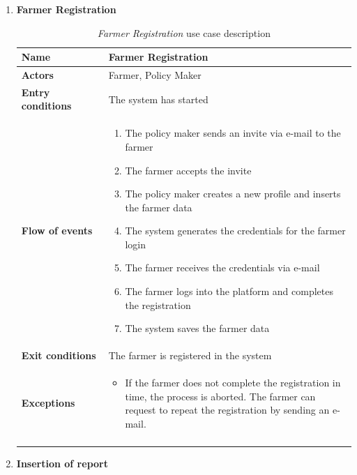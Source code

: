 \documentclass[10pt]{article}
\begin{document}
\begin{enumerate}
    \item \textbf{Farmer Registration} 
        \begin{longtable}{p{0.26\linewidth}p{0.75\linewidth}}
            \toprule
            \textbf{Name} & \textbf{Farmer Registration} \\
            \midrule
            \textbf{Actors} & Farmer, Policy Maker \\
            \midrule
            \textbf{Entry conditions} & The system has started \\
            \midrule
            \textbf{Flow of events} & 
            \begin{enumerate}
                \item The policy maker sends an invite via e-mail to the farmer
                \item The farmer accepts the invite 
                \item The policy maker creates a new profile and inserts the farmer data
                \item The system generates the credentials for the farmer login
                \item The farmer receives the credentials via e-mail
                \item The farmer logs into the platform and completes the registration
                \item The system saves the farmer data
            \end{enumerate} \\
            \midrule
            \textbf{Exit conditions} & The farmer is registered in the system\\
            \midrule
            \textbf{Exceptions} & 
            \begin{itemize}
                \item If the farmer does not complete the registration in time, the process is aborted. The farmer can request to repeat the registration by sending an e-mail.
            \end{itemize} \\
            \bottomrule
            \caption{\emph{Farmer Registration} use case description}
        \end{longtable}
    \newpage
    \item \textbf{Insertion of report}
        \begin{longtable}{p{0.26\linewidth}p{0.75\linewidth}}
            \toprule

\end{longtable}
\end{enumerate}
\end{document}
